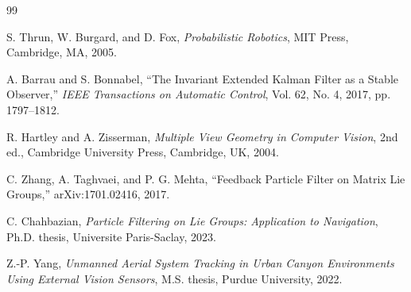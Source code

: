 \documentclass{aiaa-tc}
\begin{document}
\begin{thebibliography}{99}

S. Thrun, W. Burgard, and D. Fox, \textit{Probabilistic Robotics}, MIT Press,
Cambridge, MA, 2005.

A. Barrau and S. Bonnabel, ``The Invariant Extended Kalman Filter as a Stable
Observer,'' \textit{IEEE Transactions on Automatic Control}, Vol. 62, No. 4,
2017, pp. 1797--1812.

R. Hartley and A. Zisserman, \textit{Multiple View Geometry in Computer
Vision}, 2nd ed., Cambridge University Press, Cambridge, UK, 2004.

C. Zhang, A. Taghvaei, and P. G. Mehta, ``Feedback Particle Filter on Matrix
Lie Groups,'' arXiv:1701.02416, 2017.

C. Chahbazian, \textit{Particle Filtering on Lie Groups: Application to
Navigation}, Ph.D. thesis, Universite Paris-Saclay, 2023.

Z.-P. Yang, \textit{Unmanned Aerial System Tracking in Urban Canyon
Environments Using External Vision Sensors}, M.S. thesis, Purdue University,
2022.

\end{thebibliography}
\end{document}
